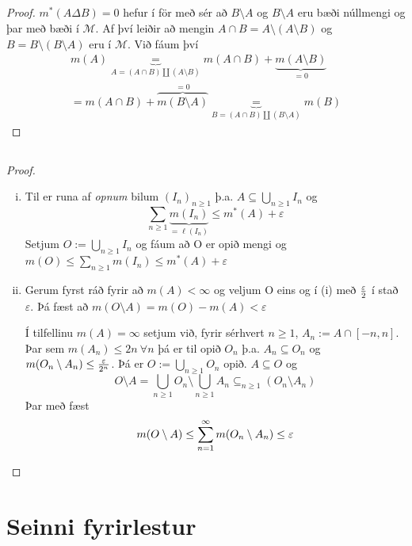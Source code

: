 \documentclass[12pt]{book}
\newcommand{\cM}{\mathcal{M}}
\begin{document}
\subsection{}
\begin{proof}
  $m^*(A \Delta B) = 0$ hefur í för með sér að $B \setminus A$ og $B \setminus A$
  eru bæði núllmengi og þar með bæði í $\cM$. Af því leiðir að mengin
  $ A \cap B = A \setminus (A \setminus B) $ og $B = B \setminus (B \setminus A)$
  eru í $\cM$.
  Við fáum því
  \begin{gather*}
    m(A) \underbrace{=}_{A = (A \cap B) \amalg (A \setminus B)} m( A \cap
    B) + \underbrace{m(A \setminus B)}_{= 0}\\
    = m(A \cap B) + \overbrace{m(B \setminus A)}^{= 0} \underbrace{=}_{B = (A \cap B) \amalg
      (B \setminus A)} m(B)
  \end{gather*}
\end{proof}

\subsection{}

\begin{proof}
  \begin{enumerate}[(i)]
  \item Til er runa af \emph{opnum} bilum $(I_n)_{n \geq 1}$ þ.a.
    $A \subseteq \bigcup_{n \geq 1} I_n$ og
    \[ \sum_{n \geq 1} \underbrace{m(I_n)}_{= \ell(I_n)} \leq m^*(A) + \varepsilon \]
    Setjum $O := \bigcup_{n \geq 1} I_n$ og fáum að O er opið mengi og
    $ m(O) \leq \sum_{n \geq 1} m(I_n) \leq m^*(A) + \varepsilon$
  \item Gerum fyrst ráð fyrir að $m(A) < \infty$ og veljum O eins og í (i) með
    $\frac{\varepsilon}{2}$ í stað $\varepsilon$.
    Þá fæst að $m(O \setminus A) = m(O) - m(A) < \varepsilon$

    Í tilfellinu $m(A) = \infty$ setjum við, fyrir sérhvert $n \geq 1$,
    $A_n := A \cap [-n,n]$.
    Þar sem $m(A_n) \leq 2 n \: \forall n$
    þá er til opið $O_n$ þ.a. $A_n \subseteq O_n$
    og $m(O_n \setminus A_n) \leq \frac{\varepsilon}{2^n}$.
    Þá er $O := \bigcup_{n \geq 1} O_n$ opið.
    $A \subseteq O$ og 
\[O \setminus A = \bigcup_{n \geq 1} O_n \setminus \bigcup_{n \geq 1} A_n \subseteq_{n \geq 1} (O_n \setminus A_n)\]
Þar með fæst \[ m(O \setminus A) \leq \sum_{n = 1}^{\infty} m(O_n \setminus A_n) \leq \varepsilon \]
    
    
  \end{enumerate}
\end{proof}

\section{Seinni fyrirlestur}







 
\end{document}
